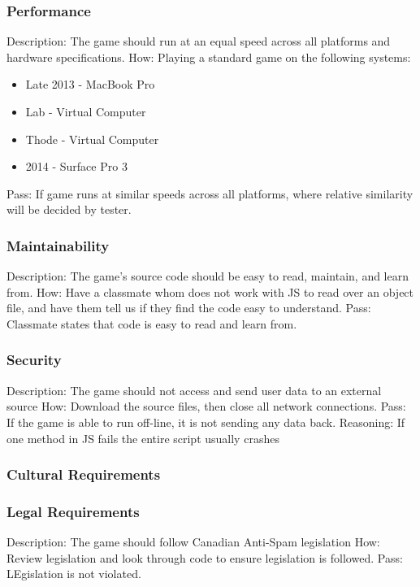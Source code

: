\documentclass{article}
\begin{document}
 \subsubsection{Performance}
Description: The game should run at an equal speed across all platforms and 
hardware specifications.  \newline
How: Playing a standard game on the following systems: 
\begin{itemize}
\item Late 2013 - MacBook Pro
\item Lab - Virtual Computer
\item Thode - Virtual Computer
\item 2014 - Surface Pro 3
\end{itemize}
Pass: If game runs at similar speeds across all platforms, where relative 
similarity will be decided by tester.

 \subsubsection{Maintainability}
 Description: The game's source code should be easy to read, maintain, and 
 learn from. \newline
 How: Have a classmate whom does not work with JS to read over an object file, 
 and have them tell us if they find the code easy to understand. \newline
 Pass: Classmate states that code is easy to read and learn from.

 \subsubsection{Security}
Description: The game should not access and send user data to an external 
source \newline
How: Download the source files, then close all network connections.\newline
Pass: If the game is able to run off-line, it is not sending any data back.
Reasoning: If one method in JS fails the entire script usually crashes

\subsubsection{Cultural Requirements}


\subsubsection{Legal Requirements}
 Description: The game should follow Canadian Anti-Spam legislation \newline
 How: Review legislation and look through code to ensure legislation is 
 followed. \newline
 Pass: LEgislation is not violated.
\end{document}
